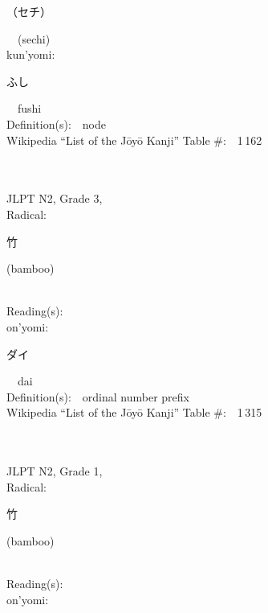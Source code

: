 \begin{multicols}{2}
{\hspace*{2em}}{\begin{CJK}{UTF8}{min} （セチ） \end{CJK}}\ \ (sechi)\ \ \\
{\hspace*{1em}}kun'yomi:\ \ \\
{\hspace*{2em}}{\begin{CJK}{UTF8}{min} ふし \end{CJK}}\ \ fushi\ \ \\
Definition(s):\ \ node \\
Wikipedia ``List of the J\=oy\=o Kanji'' Table \#:\ \ 1\,162 \\
\ \ \\
{\fontsize{34pt}{40pt}  }\ \ \\  %
{JLPT N2, Grade 3, \\Radical:\ \ {\begin{CJK}{UTF8}{min} 竹 \end{CJK}} (bamboo) } \\
Reading(s):\ \ \\
{\hspace*{1em}}on'yomi:\ \ \\
{\hspace*{2em}}{\begin{CJK}{UTF8}{min} ダイ \end{CJK}}\ \ dai\ \ \\
Definition(s):\ \ ordinal number prefix \\
Wikipedia ``List of the J\=oy\=o Kanji'' Table \#:\ \ 1\,315 \\
\ \ \\
{\fontsize{34pt}{40pt}  }\ \ \\  %
{JLPT N2, Grade 1, \\Radical:\ \ {\begin{CJK}{UTF8}{min} 竹 \end{CJK}} (bamboo) } \\
Reading(s):\ \ \\
{\hspace*{1em}}on'yomi:\ \ \\

\end{multicols}
